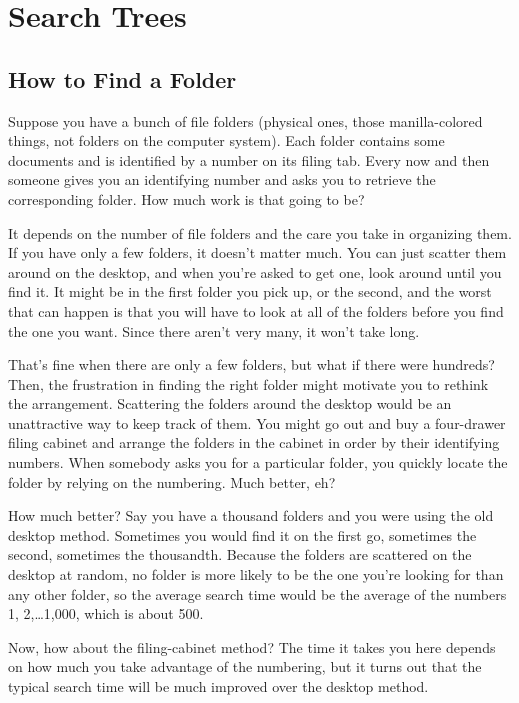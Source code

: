 \chapter{Search Trees}
\label{ch:search-trees}

\section{How to Find a Folder}

Suppose you have a bunch of file folders (physical ones, those
manilla-colored things, not folders on the computer system). Each
folder contains some documents and is identified by a number on its
filing tab. Every now and then someone gives you an identifying
number and asks you to retrieve the corresponding folder. How much
work is that going to be?

It depends on the number of file folders and the care you take in
organizing them. If you have only a few folders, it doesn't matter
much. You can just scatter them around on the desktop, and when
you're asked to get one, look around until you find it. It might be
in the first folder you pick up, or the second, and the worst that
can happen is that you will have to look at all of the folders
before you find the one you want. Since there aren't very many, it
won't take long.

That's fine when there are only a few folders, but what if there
were hundreds? Then, the frustration in finding the right folder
might motivate you to rethink the arrangement. Scattering the
folders around the desktop would be an unattractive way to keep
track of them. You might go out and buy a four-drawer filing cabinet
and arrange the folders in the cabinet in order by their identifying
numbers. When somebody asks you for a particular folder, you quickly
locate the folder by relying on the numbering. Much better, eh?

How much better? Say you have a thousand folders and you were using the
old desktop method. Sometimes you would find it on the first go,
sometimes the second, sometimes the thousandth. Because the folders
are scattered on the desktop at random, no folder is more likely to
be the one you're looking for than any other folder, so the average
search time would be the average of the numbers 1, 2,\dots 1,000,
which is about 500.

Now, how about the filing-cabinet method? The time it takes you here
depends on how much you take advantage of the numbering, but it
turns out that the typical search time will be much improved over
the desktop method.

